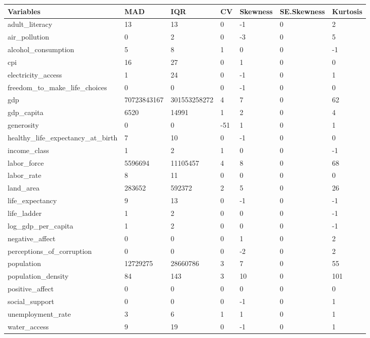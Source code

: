 \begin{table}[!ht]
\scriptsize
    \centering
    \begin{tabular}{|l|l|l|l|l|l|l|}
    \hline
        Variables & MAD & IQR & CV & Skewness & SE.Skewness & Kurtosis \\ \hline
        adult\_literacy & 13 & 13 & 0 & -1 & 0 & 2 \\ \hline
        air\_pollution & 0 & 2 & 0 & -3 & 0 & 5 \\ \hline
        alcohol\_consumption & 5 & 8 & 1 & 0 & 0 & -1 \\ \hline
        cpi & 16 & 27 & 0 & 1 & 0 & 0 \\ \hline
        electricity\_access & 1 & 24 & 0 & -1 & 0 & 1 \\ \hline
        freedom\_to\_make\_life\_choices & 0 & 0 & 0 & -1 & 0 & 0 \\ \hline
        gdp & 70723843167 & 301553258272 & 4 & 7 & 0 & 62 \\ \hline
        gdp\_capita & 6520 & 14991 & 1 & 2 & 0 & 4 \\ \hline
        generosity & 0 & 0 & -51 & 1 & 0 & 1 \\ \hline
        healthy\_life\_expectancy\_at\_birth & 7 & 10 & 0 & -1 & 0 & 0 \\ \hline
        income\_class & 1 & 2 & 1 & 0 & 0 & -1 \\ \hline
        labor\_force & 5596694 & 11105457 & 4 & 8 & 0 & 68 \\ \hline
        labor\_rate & 8 & 11 & 0 & 0 & 0 & 0 \\ \hline
        land\_area & 283652 & 592372 & 2 & 5 & 0 & 26 \\ \hline
        life\_expectancy & 9 & 13 & 0 & -1 & 0 & -1 \\ \hline
        life\_ladder & 1 & 2 & 0 & 0 & 0 & -1 \\ \hline
        log\_gdp\_per\_capita & 1 & 2 & 0 & 0 & 0 & -1 \\ \hline
        negative\_affect & 0 & 0 & 0 & 1 & 0 & 2 \\ \hline
        perceptions\_of\_corruption & 0 & 0 & 0 & -2 & 0 & 2 \\ \hline
        population & 12729275 & 28660786 & 3 & 7 & 0 & 55 \\ \hline
        population\_density & 84 & 143 & 3 & 10 & 0 & 101 \\ \hline
        positive\_affect & 0 & 0 & 0 & 0 & 0 & 0 \\ \hline
        social\_support & 0 & 0 & 0 & -1 & 0 & 1 \\ \hline
        unemployment\_rate & 3 & 6 & 1 & 1 & 0 & 1 \\ \hline
        water\_access & 9 & 19 & 0 & -1 & 0 & 1 \\ \hline
    \end{tabular}
\end{table}

